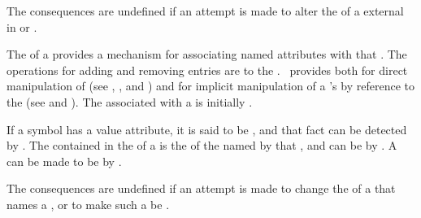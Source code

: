 The consequences are undefined if an attempt is made to alter the 
of a  
external
in  or .


The  of a  provides a mechanism for
associating named attributes with that .
The operations for adding and removing entries are 
to the .  \clisp\ provides  both for
direct manipulation of   
 (\eg see , , and )
and for implicit manipulation of a 's  
by reference to the  
 (\eg see  and ).
The  associated with a   is 
initially .


If a symbol has a value attribute, it is said to be ,
and that fact can be detected by .
The  contained in the  of a  
is the  of the  named by that , 
and can be  by .
A  can be made to be  by .

The consequences are undefined if an attempt is made to change the 
of a  that names a , or to make such a 
 be .

